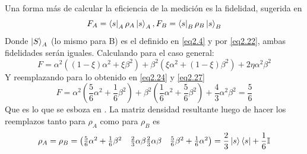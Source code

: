 \documentclass{book}
\begin{document}
Una forma más de calcular la eficiencia de la medición es la fidelidad, sugerida en \textcolor{red}{\cite{bib2}}
\begin{equation}\label{eq2.28}{F_A=\bra{s}_A\rho_A\ket{s}_A, F_B=\bra{s}_B\rho_B\ket{s}_B}\end{equation}
Donde $\ket{S}_A$ (lo mismo para B) es el definido en \textcolor{blue}{\ref{eq2.4}} y por \textcolor{blue}{\ref{eq2.22}}, ambas fidelidades serán iguales. Calculando para el caso general:
\begin{equation}\label{eq2.29}{F=\alpha^2((1-\xi)\alpha^2+\xi\beta^2)+\beta^2(\xi\alpha^2+(1-\xi)\beta^2)+2\eta\alpha^2\beta^2}\end{equation}
Y reemplazando para lo obtenido en \textcolor{blue}{\ref{eq2.24}} y \textcolor{blue}{\ref{eq2.27}}
\begin{equation}\label{eq2.30}{F=\alpha^2(\frac{5}{6}\alpha^2+\frac{1}{6}\beta^2)+\beta^2(\frac{1}{6}\alpha^2+\frac{5}{6}\beta^2)+\frac{4}{3}\alpha^2\beta^2=\frac{5}{6}}\end{equation}
Que es lo que se esboza en \textcolor{red}{\cite{bib2}}. La matriz densidad resultante luego de hacer los reemplazos tanto para $\rho_A$ como para $\rho_B$ es 
\begin{equation}\label{eq2.31}{\rho_A=\rho_B=\begin{pmatrix}\frac{5}{6} \alpha^2+ \frac{1}{6} \beta^2 & \frac{2}{3} \alpha\beta \frac{2}{3}\alpha\beta & \frac{5}{6} \beta^2 + \frac{1}{6}\alpha^2\end{pmatrix}= \frac{2}{3}\ket{s}\bra{s}+\frac{1}{6}\mathbb{I}}\end{equation}
\end{document}
